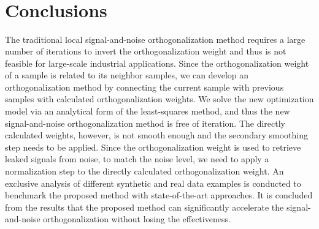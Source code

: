\begin{figure}[htb!]
\centering
{}
\\
\\
\\   
\\    
\caption{}
\label{fig:comp}
\end{figure}

\section{Conclusions}
The traditional local signal-and-noise orthogonalization method requires a large number of iterations to invert the orthogonalization weight and thus is not feasible for large-scale industrial applications. Since the orthogonalization weight of a sample is related to its neighbor samples, we can develop an orthogonalization method by connecting the current sample with previous samples with calculated orthogonalization weights. We solve the new optimization model via an analytical form of the least-squares method, and thus the new signal-and-noise orthogonalization method is free of iteration. The directly calculated weights, however, is not smooth enough and the secondary smoothing step needs to be applied. Since the orthogonalization weight is used to retrieve leaked signals from noise, to match the noise level, we need to apply a normalization step to the directly calculated orthogonalization weight. An exclusive analysis of different synthetic and real data examples is conducted to benchmark the proposed method with state-of-the-art approaches. It is concluded from the results that the proposed method can significantly accelerate the signal-and-noise orthogonalization without losing the effectiveness. 










